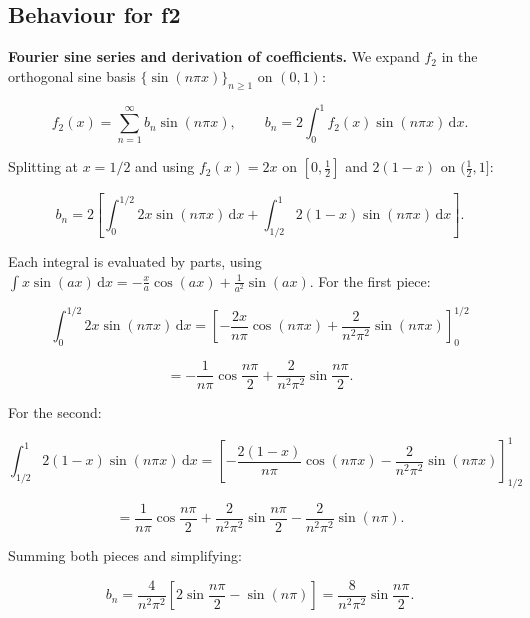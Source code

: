 \documentclass[11pt,a4paper]{article}
\begin{document}
\subsection{Behaviour for f2}

\textbf{Fourier sine series and derivation of coefficients.} We expand $f_2$ in the orthogonal sine basis $\{\sin(n\pi x)\}_{n\ge 1}$ on $(0,1)$:

\begin{equation}
f_2(x) = \sum_{n=1}^{\infty} b_n \sin(n\pi x), \qquad b_n = 2\int_0^1 f_2(x)\sin(n\pi x)\,\mathrm{d}x. \tag{6}
\end{equation}

Splitting at $x = 1/2$ and using $f_2(x) = 2x$ on $[0,\tfrac{1}{2}]$ and $2(1-x)$ on $(\tfrac{1}{2},1]$:

\begin{equation}
b_n = 2\left[\int_0^{1/2} 2x\sin(n\pi x)\,\mathrm{d}x + \int_{1/2}^{1} 2(1-x)\sin(n\pi x)\,\mathrm{d}x\right]. \tag{7}
\end{equation}

Each integral is evaluated by parts, using $\int x\sin(ax)\,\mathrm{d}x = -\tfrac{x}{a}\cos(ax) + \tfrac{1}{a^2}\sin(ax)$. For the first piece:

\begin{equation}
\int_0^{1/2} 2x\sin(n\pi x)\,\mathrm{d}x = \left[-\frac{2x}{n\pi}\cos(n\pi x) + \frac{2}{n^2\pi^2}\sin(n\pi x)\right]_0^{1/2} \tag{8}
\end{equation}

\begin{equation*}
= -\frac{1}{n\pi}\cos\!\frac{n\pi}{2} + \frac{2}{n^2\pi^2}\sin\!\frac{n\pi}{2}.
\end{equation*}

For the second:

\begin{equation}
\int_{1/2}^{1} 2(1-x)\sin(n\pi x)\,\mathrm{d}x = \left[-\frac{2(1-x)}{n\pi}\cos(n\pi x) - \frac{2}{n^2\pi^2}\sin(n\pi x)\right]_{1/2}^{1} \tag{9}
\end{equation}

\begin{equation*}
= \frac{1}{n\pi}\cos\!\frac{n\pi}{2} + \frac{2}{n^2\pi^2}\sin\!\frac{n\pi}{2} - \frac{2}{n^2\pi^2}\sin(n\pi).
\end{equation*}

Summing both pieces and simplifying:

\begin{equation}
b_n = \frac{4}{n^2\pi^2}\left[2\sin\!\frac{n\pi}{2} - \sin(n\pi)\right] = \frac{8}{n^2\pi^2}\sin\!\frac{n\pi}{2}. \tag{10}
\end{equation}
\end{document}

